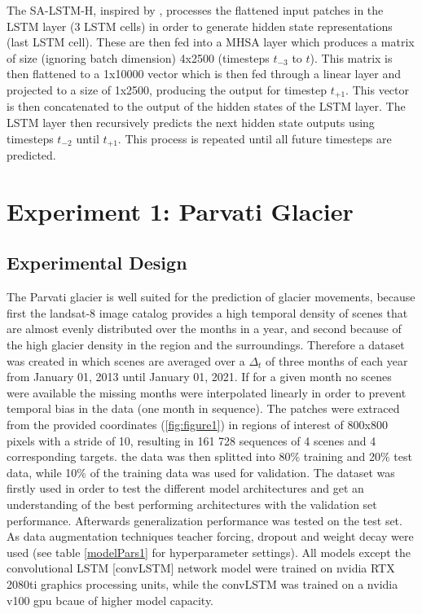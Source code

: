 \documentclass[12pt]{article}
\begin{document}
The SA-LSTM-H, inspired by \citet{mu2023icetft}, processes the flattened input patches in the LSTM layer (3 LSTM cells) in order to generate hidden state representations (last LSTM cell). These are then fed into a MHSA layer which produces a matrix of size (ignoring batch dimension) 4x2500 (timesteps $t_{-3}$ to $t$). This matrix is then flattened to a 1x10000 vector which is then fed through a linear layer and projected to a size of 1x2500, producing the output for timestep $t_{+1}$. This vector is then concatenated to the output of the hidden states of the LSTM layer. The LSTM layer then recursively predicts the next hidden state outputs using timesteps $t_{-2}$ until $t_{+1}$. This process is repeated until all future timesteps are predicted.

\section{Experiment 1: Parvati Glacier}
\subsection{Experimental Design}
The Parvati glacier is well suited for the prediction of glacier movements, because first the landsat-8 image catalog provides a high temporal density of scenes that are almost evenly distributed over the months in a year, and second because of the high glacier density in the region and the surroundings. Therefore a dataset was created in which scenes are averaged over a $\Delta_t$ of three months of each year from January 01, 2013 until January 01, 2021. If for a given month no scenes were available the missing months were interpolated linearly in order to prevent temporal bias in the data (one month in sequence). The patches were extraced from the provided coordinates (\ref{fig:figure1}) in regions of interest of 800x800 pixels with a stride of 10, resulting in 161 728 sequences of 4 scenes and 4 corresponding targets. the data was then splitted into 80\% training and 20\% test data, while 10\% of the training data was used for validation. The dataset was firstly used in order to test the different model architectures and get an understanding of the best performing architectures with the validation set performance. Afterwards generalization performance was tested on the test set. As data augmentation techniques teacher forcing, dropout and weight decay were used (see table \ref{modelPars1} for hyperparameter settings). All models except the convolutional LSTM [convLSTM] network model were trained on nvidia RTX 2080ti graphics processing units, while the convLSTM was trained on a nvidia v100 gpu bcaue of higher model capacity.
\end{document}
